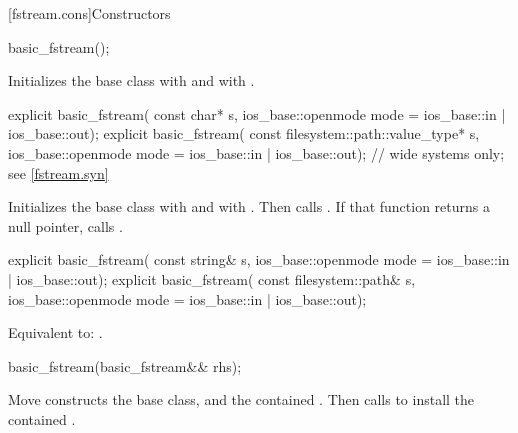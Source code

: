 [fstream.cons]{Constructors}

%
\begin{itemdecl}
basic_fstream();
\end{itemdecl}

\begin{itemdescr}
\pnum
\effects
Initializes the base class with
and
 with .
\end{itemdescr}

%
\begin{itemdecl}
explicit basic_fstream(
  const char* s,
  ios_base::openmode mode = ios_base::in | ios_base::out);
explicit basic_fstream(
  const filesystem::path::value_type* s,
  ios_base::openmode mode = ios_base::in | ios_base::out);  // wide systems only; see \ref{fstream.syn}
\end{itemdecl}

\begin{itemdescr}
\pnum
\effects
Initializes the base class with
and
 with .
Then calls
.
If that function returns a null pointer, calls
.
\end{itemdescr}

%
\begin{itemdecl}
explicit basic_fstream(
  const string& s,
  ios_base::openmode mode = ios_base::in | ios_base::out);
explicit basic_fstream(
  const filesystem::path& s,
  ios_base::openmode mode = ios_base::in | ios_base::out);
\end{itemdecl}

\begin{itemdescr}
\pnum
\effects
Equivalent to: .
\end{itemdescr}

%
\begin{itemdecl}
basic_fstream(basic_fstream&& rhs);
\end{itemdecl}

\begin{itemdescr}
\pnum
\effects
Move constructs the base class, and the contained .
Then calls 
to install the contained .
\end{itemdescr}

